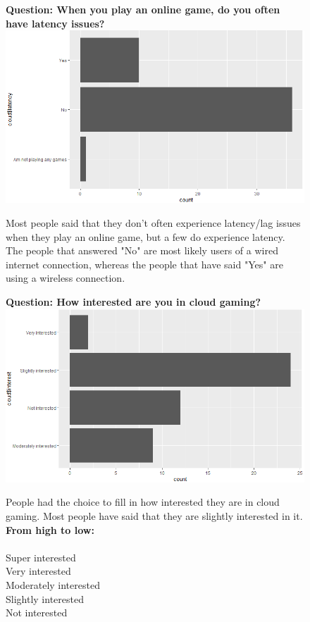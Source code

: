 \begin{figure}[ht]
	\centering
	\textbf{Question: When you play an online game, do you often have latency issues?}
	\includegraphics[width=12cm]{../img/latency.png}
	\caption{Most people said that they don't often experience latency/lag issues when they play an online game, but a few do experience latency. The people that answered "No" are most likely users of a wired internet connection, whereas the people that have said "Yes" are using a wireless connection.}
\end{figure}
\begin{figure}[ht]
	\centering
	\textbf{Question: How interested are you in cloud gaming?}
	\includegraphics[width=12cm]{../img/interest.png}
	\caption{People had the choice to fill in how interested they are in cloud gaming. Most people have said that they are slightly interested in it. \\\textbf{From high to low:}\\\\
		Super interested\\
		Very interested\\
		Moderately interested\\
		Slightly interested\\
		Not interested}
\end{figure}
